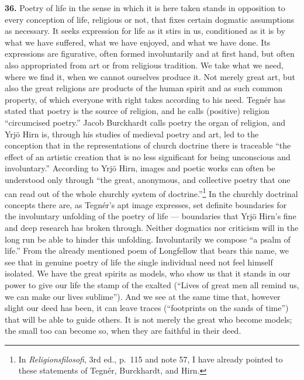 \documentclass[12pt]{book}
\newcommand{\hnum}[1]{\textbf{#1.}\enspace}
\newcommand{\opage}[1]{\marginnote{\footnotesize\textit{[#1]}}}
\begin{document}
\hnum{36} Poetry of life in the sense in which it is here taken stands in opposition to every conception of
life, religious or not, that fixes certain dogmatic assumptions as necessary. It seeks expression for life
as it stirs in us, conditioned as it is by what we have suffered, what we have enjoyed, and what we have
done. Its expressions are figurative, often formed involuntarily and at first hand, but often also
appropriated from art or from religious tradition. We take what we need, where we find it, when we cannot
ourselves produce it. Not merely great art, but also the great religions are products of the human spirit
and as such common property, of which everyone with right takes according to his need. Tegnér has stated
that poetry is the source of religion, and he calls (positive) religion \opage{119}``circumcised poetry.'' Jacob
Burckhardt calls poetry the organ of religion, and Yrjö Hirn is, through his studies of medieval poetry and
art, led to the conception that in the representations of church doctrine there is traceable ``the effect of
an artistic creation that is no less significant for being unconscious and involuntary.'' According to Yrjö
Hirn, images and poetic works can often be understood only through ``the great, anonymous, and collective
poetry that one can read out of the whole churchly system of doctrine.''\footnote{In
\textit{Religionsfilosofi}, 3rd ed., p.\ 115 and note 57, I have already pointed to these statements of
Tegnér, Burckhardt, and Hirn.} In the churchly doctrinal concepts there are, as Tegnér's apt image
expresses, set definite boundaries for the involuntary unfolding of the poetry of life --- boundaries that
Yrjö Hirn's fine and deep research has broken through. Neither dogmatics nor criticism will in the long run
be able to hinder this unfolding. Involuntarily we compose ``a psalm of life.'' From the already mentioned
poem of Longfellow that bears this name, we see that in genuine poetry of life the single individual need not
feel himself isolated. We have the great spirits as models, who show us that it stands in our power to give
our life the stamp of the exalted (``Lives of great men all remind us, we can make our lives sublime''). And
we see at the same time that, however slight our deed has been, it can leave traces (``footprints on the
sands of time'') that will be able to guide others. It is not merely the great who become models; the small
too can become so, when they are faithful in their deed.
\end{document}
